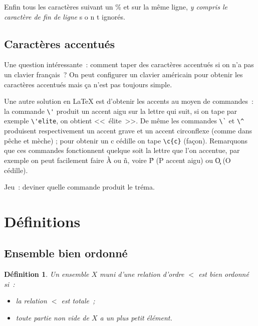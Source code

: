 \documentclass{article}
\newtheorem{de}{Définition}[subsection] %
\begin{document}
Enfin tous les caractères suivant un \% et sur la même ligne, 
\emph{y compris le caractère de fin de ligne} s%
o%
n%
t %
ignorés.

\subsection{Caractères accentués}
Une question intéressante~: comment taper des caractères accentués si on n'a
pas un clavier français~? On peut configurer un clavier américain pour obtenir
les caractères accentués mais ça n'est pas toujours simple.

Une autre solution en \LaTeX{} est d'obtenir les accents au moyen de
commandes~: la commande \verb|\'| produit un accent aigu sur la lettre qui
suit, si on tape par exemple \verb|\'elite|, on obtient <<~\'elite~>>. De même
les commandes \verb|\`| et \verb|\^| produisent respectivement un accent grave
et un accent circonflexe (comme dans p\^eche et m\`eche) ; pour obtenir un c
cédille on tape \verb|\c{c}| (fa\c{c}on). Remarquons que ces commandes
fonctionnent quelque soit la lettre que l'on accentue, par exemple on peut
facilement faire \`A ou \~n, voire \'P (P accent aigu) ou \c{O} (O cédille).

Jeu~: deviner quelle commande produit le tréma.

\section{Définitions}
\subsection{Ensemble bien ordonné}


\begin{de}
Un ensemble $X$ muni d'une relation d'ordre $<$ est \emph{bien ordonné} si~:
\begin{itemize}
\item la relation $<$ est totale~;
\item toute partie non vide de $X$ a un plus petit élément.
\end{itemize}
\end{de}
\end{document}
